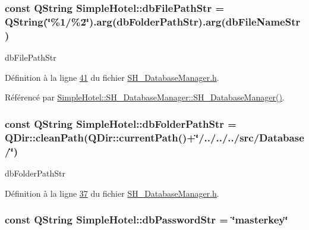 \hypertarget{namespaceSimpleHotel_a9d185fdd7e70bbd3e92512596899a6f8}{
\subsubsection[{db\-File\-Path\-Str}]{\setlength{\rightskip}{0pt plus 5cm}const Q\-String Simple\-Hotel\-::db\-File\-Path\-Str = Q\-String(\char`\"{}\%1/\%2\char`\"{}).arg({\bf db\-Folder\-Path\-Str}).arg({\bf db\-File\-Name\-Str})\hspace{0.3cm}{\ttfamily [static]}}}\label{namespaceSimpleHotel_a9d185fdd7e70bbd3e92512596899a6f8}


db\-File\-Path\-Str 



Définition à la ligne \hyperlink{SH__DatabaseManager_8h_source_l00041}{41} du fichier \hyperlink{SH__DatabaseManager_8h_source}{S\-H\-\_\-\-Database\-Manager.\-h}.



Référencé par \hyperlink{classSimpleHotel_1_1SH__DatabaseManager_ade00a085fdf7207d67476179e179d03d}{Simple\-Hotel\-::\-S\-H\-\_\-\-Database\-Manager\-::\-S\-H\-\_\-\-Database\-Manager()}.

\hypertarget{namespaceSimpleHotel_a78f69326b2ab0f42c50cc69fcc51336a}{
\subsubsection[{db\-Folder\-Path\-Str}]{\setlength{\rightskip}{0pt plus 5cm}const Q\-String Simple\-Hotel\-::db\-Folder\-Path\-Str = Q\-Dir\-::clean\-Path(Q\-Dir\-::current\-Path()+\char`\"{}/../../../src/Database/\char`\"{})\hspace{0.3cm}{\ttfamily [static]}}}\label{namespaceSimpleHotel_a78f69326b2ab0f42c50cc69fcc51336a}


db\-Folder\-Path\-Str 



Définition à la ligne \hyperlink{SH__DatabaseManager_8h_source_l00037}{37} du fichier \hyperlink{SH__DatabaseManager_8h_source}{S\-H\-\_\-\-Database\-Manager.\-h}.

\hypertarget{namespaceSimpleHotel_aebaf9c2c494a4e88db921d6140604714}{
\subsubsection[{db\-Password\-Str}]{\setlength{\rightskip}{0pt plus 5cm}const Q\-String Simple\-Hotel\-::db\-Password\-Str = \char`\"{}masterkey\char`\"{}\hspace{0.3cm}{\ttfamily [static]}}}\label{namespaceSimpleHotel_aebaf9c2c494a4e88db921d6140604714}


